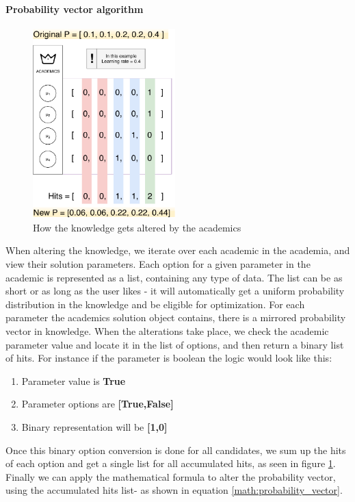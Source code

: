\documentclass[a4paper,english]{report}
\begin{document}
		\paragraph{Probability vector algorithm}
		\begin{figure}
			\caption{How the knowledge gets altered by the academics}
			\label{fig:memory_insight}
			\includegraphics[width=5.5cm]{memory_insight}
		\end{figure} 
		When altering the knowledge, we iterate over each academic in the academia, and view their solution parameters. Each option for a given parameter in the academic is represented as a list, containing any type of data. The list can be as short or as long as the user likes - it will automatically get a uniform probability distribution in the knowledge and be eligible for optimization. For each parameter the academics solution object contains, there is a mirrored probability vector in knowledge. When the alterations take place, we check the academic parameter value and locate it in the list of options, and then return a binary list of hits. For instance if the parameter is boolean the logic would look like this:
		\begin{enumerate}
			\item Parameter value is \textbf{True}
			\item Parameter options are \textbf{[True,False]}
			\item Binary representation will be \textbf{[1,0]}
		\end{enumerate}
		Once this binary option conversion is done for all candidates, we sum up the hits of each option and get a single list for all accumulated hits, as seen in figure \ref{fig:memory_insight}. Finally we can apply the mathematical formula to alter the probability vector, using the accumulated hits list- as shown in equation \ref{math:probability_vector}.\\
\end{document}
